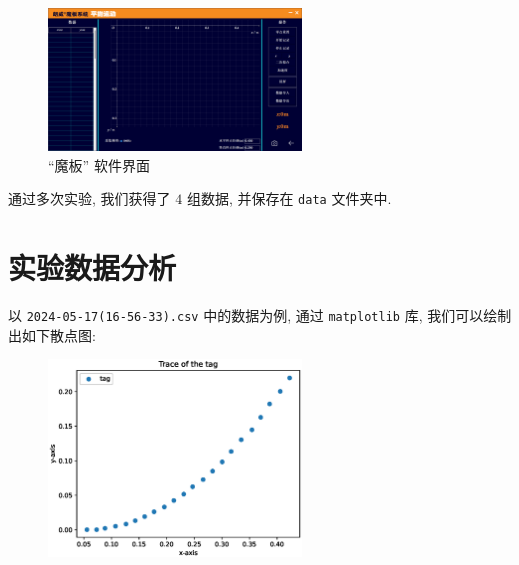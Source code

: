 \documentclass{article}
\begin{document}
\begin{figure}[H]
    \centering
    \includegraphics[width=0.6\textwidth]{figures/magic-board.png}
    \caption{``魔板'' 软件界面}
    \label{fig:software}
\end{figure}

通过多次实验, 我们获得了 $4$ 组数据, 并保存在 \texttt{data} 文件夹中.

\section{实验数据分析}

以 \texttt{2024-05-17(16-56-33).csv} 中的数据为例, 通过 \texttt{matplotlib} 库, 我们可以绘制出如下散点图:

\begin{figure}[H]
    \centering
    \includegraphics[width=0.6\textwidth]{figures/plot1.eps}
\end{figure}
\end{document}
